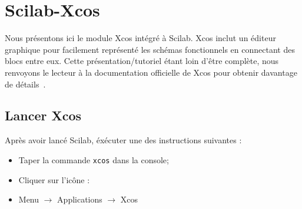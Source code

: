 \newpage
\section{Scilab-Xcos}
Nous présentons ici le module Xcos intégré à Scilab. Xcos inclut un 
éditeur graphique pour facilement représenté les schémas fonctionnels
en connectant des blocs entre eux. Cette présentation/tutoriel étant loin d'être complète,
nous renvoyons le lecteur à la documentation officielle de Xcos pour obtenir davantage de détails~\cite{steer2014scilab,premier,xcos}. 

\subsection{Lancer Xcos}
Après avoir lancé Scilab, éxécuter une des instructions suivantes :
\begin{itemize}
    \item Taper la commande \verb?xcos? dans la console;
    \item Cliquer sur l'icône : 
    \item Menu $\rightarrow$ Applications $\rightarrow$ Xcos
\end{itemize}


